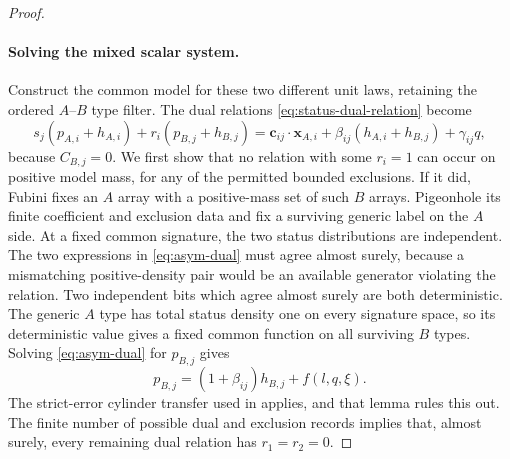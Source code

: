 \begin{proof}
\paragraph{Solving the mixed scalar system.}
Construct the common model for these two different unit laws,
retaining the ordered \(A\)--\(B\) type filter.  The dual
relations \eqref{eq:status-dual-relation} become
\begin{equation}
\label{eq:asym-dual}
 s_j(p_{A,i}+h_{A,i})+r_i(p_{B,j}+h_{B,j})
 =\mathbf c_{ij}\cdot\mathbf x_{A,i}
       +\beta_{ij}(h_{A,i}+h_{B,j})+\gamma_{ij}q,
\end{equation}
because \(C_{B,j}=0\).  We first show that no relation with
some \(r_i=1\) can occur on positive model mass, for any of
the permitted bounded exclusions.  If it did, Fubini fixes an
\(A\) array with a positive-mass set of such \(B\) arrays.
Pigeonhole its finite coefficient and exclusion data and fix a
surviving generic label on the \(A\) side.  At a fixed common
signature, the two status distributions are independent.  The
two expressions in \eqref{eq:asym-dual} must agree almost
surely, because a mismatching positive-density pair would be an
available generator violating the relation.  Two independent
bits which agree almost surely are both deterministic.  The
generic \(A\) type has total status density one on every
signature space, so its deterministic value gives a fixed
common function on all surviving \(B\) types.  Solving
\eqref{eq:asym-dual} for \(p_{B,j}\) gives
\[
 p_{B,j}=(1+\beta_{ij})h_{B,j}+f(l,q,\xi).
\]
The strict-error cylinder transfer used in
 applies, and that lemma
rules this out.  The finite number of possible dual and
exclusion records implies that, almost surely, every remaining
dual relation has \(r_1=r_2=0\).


\end{proof}
